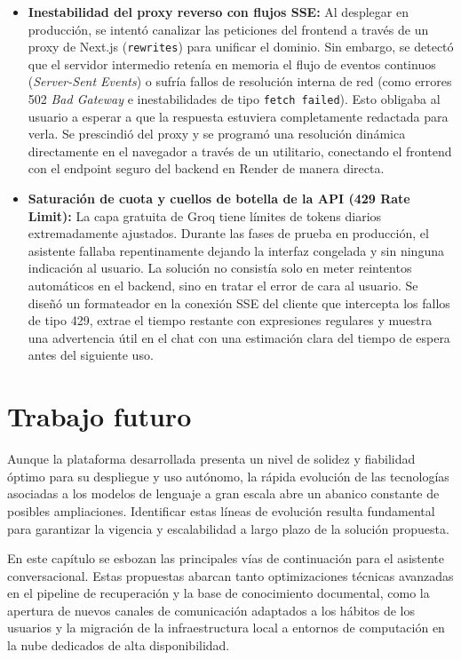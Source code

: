 \documentclass[12pt,a4paper,oneside]{report}
\begin{document}
\begin{itemize}
    \item \textbf{Inestabilidad del proxy reverso con flujos SSE:} Al desplegar en producción, se intentó canalizar las peticiones del frontend a través de un proxy de Next.js (\texttt{rewrites}) para unificar el dominio. Sin embargo, se detectó que el servidor intermedio retenía en memoria el flujo de eventos continuos (\textit{Server-Sent Events}) o sufría fallos de resolución interna de red (como errores 502 \textit{Bad Gateway} e inestabilidades de tipo \texttt{fetch failed}). Esto obligaba al usuario a esperar a que la respuesta estuviera completamente redactada para verla. Se prescindió del proxy y se programó una resolución dinámica directamente en el navegador a través de un utilitario, conectando el frontend con el endpoint seguro del backend en Render de manera directa.
    \item \textbf{Saturación de cuota y cuellos de botella de la API (429 Rate Limit):} La capa gratuita de Groq tiene límites de tokens diarios extremadamente ajustados. Durante las fases de prueba en producción, el asistente fallaba repentinamente dejando la interfaz congelada y sin ninguna indicación al usuario. La solución no consistía solo en meter reintentos automáticos en el backend, sino en tratar el error de cara al usuario. Se diseñó un formateador en la conexión SSE del cliente que intercepta los fallos de tipo 429, extrae el tiempo restante con expresiones regulares y muestra una advertencia útil en el chat con una estimación clara del tiempo de espera antes del siguiente uso.
\end{itemize}

\chapter{Trabajo futuro}

Aunque la plataforma desarrollada presenta un nivel de solidez y fiabilidad óptimo para su despliegue y uso autónomo, la rápida evolución de las tecnologías asociadas a los modelos de lenguaje a gran escala abre un abanico constante de posibles ampliaciones. Identificar estas líneas de evolución resulta fundamental para garantizar la vigencia y escalabilidad a largo plazo de la solución propuesta.

En este capítulo se esbozan las principales vías de continuación para el asistente conversacional. Estas propuestas abarcan tanto optimizaciones técnicas avanzadas en el pipeline de recuperación y la base de conocimiento documental, como la apertura de nuevos canales de comunicación adaptados a los hábitos de los usuarios y la migración de la infraestructura local a entornos de computación en la nube dedicados de alta disponibilidad.
\end{document}

